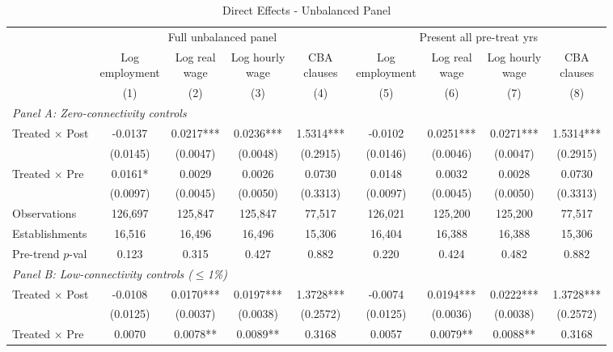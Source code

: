 \begin{table}[H]
\centering
\scriptsize
\caption{Direct Effects - Unbalanced Panel}
\begin{tabular}{lcccccccc}
\toprule
& \multicolumn{4}{c}{Full unbalanced panel} & \multicolumn{4}{c}{Present all pre-treat yrs} \\
\cmidrule(lr){2-5} \cmidrule(lr){6-9}
& \shortstack{Log\\employment} & \shortstack{Log real\\wage} & \shortstack{Log hourly\\wage} & \shortstack{CBA\\clauses} & \shortstack{Log\\employment} & \shortstack{Log real\\wage} & \shortstack{Log hourly\\wage} & \shortstack{CBA\\clauses} \\
& (1) & (2) & (3) & (4) & (5) & (6) & (7) & (8) \\
\midrule
\multicolumn{9}{l}{\textit{Panel A: Zero-connectivity controls}} \\
\midrule
Treated $\times$ Post & -0.0137 & 0.0217*** & 0.0236*** & 1.5314*** & -0.0102 & 0.0251*** & 0.0271*** & 1.5314*** \\
& (0.0145) & (0.0047) & (0.0048) & (0.2915) & (0.0146) & (0.0046) & (0.0047) & (0.2915) \\[3pt]
Treated $\times$ Pre & 0.0161* & 0.0029 & 0.0026 & 0.0730 & 0.0148 & 0.0032 & 0.0028 & 0.0730 \\
& (0.0097) & (0.0045) & (0.0050) & (0.3313) & (0.0097) & (0.0045) & (0.0050) & (0.3313) \\[3pt]
\midrule
Observations & 126,697 & 125,847 & 125,847 & 77,517 & 126,021 & 125,200 & 125,200 & 77,517 \\
Establishments & 16,516 & 16,496 & 16,496 & 15,306 & 16,404 & 16,388 & 16,388 & 15,306 \\
Pre-trend $p$-val & 0.123 & 0.315 & 0.427 & 0.882 & 0.220 & 0.424 & 0.482 & 0.882 \\
\midrule
\multicolumn{9}{l}{\textit{Panel B: Low-connectivity controls ($\leq$1\%)}} \\
\midrule
Treated $\times$ Post & -0.0108 & 0.0170*** & 0.0197*** & 1.3728*** & -0.0074 & 0.0194*** & 0.0222*** & 1.3728*** \\
& (0.0125) & (0.0037) & (0.0038) & (0.2572) & (0.0125) & (0.0036) & (0.0038) & (0.2572) \\[3pt]
Treated $\times$ Pre & 0.0070 & 0.0078** & 0.0089** & 0.3168 & 0.0057 & 0.0079** & 0.0088** & 0.3168 \\

\end{tabular}
\end{table}
